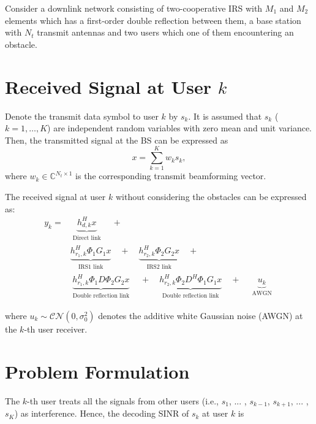 \documentclass[review]{elsarticle}
\begin{document}
		Consider a downlink network consisting of two-cooperative IRS with $M_1$ and $M_2$ elements which has a first-order double reflection between them, a base station with $N_t$ transmit antennas and two users which one of them encountering an obstacle.
		
	\section{Received Signal at User $k$}
		Denote the transmit data symbol to user $k$ by $s_k$. It is assumed that $s_k$ ($k = 1, \ldots, K$) are independent random variables with zero mean and unit variance. Then, the transmitted signal at the BS can be expressed as
		\begin{equation}
			x = \sum_{k=1}^{K} w_k s_k, \label{eq:transmitted_signal}
		\end{equation}
		where $w_k \in \mathbb{C}^{N_t \times 1}$ is the corresponding transmit beamforming vector.
		
		The received signal at user $k$ without considering the obstacles can be expressed as:
		\begin{align*}
			y_k = &\underbrace{h_{d,k}^H x}_
					{\substack{\text{Direct link}}}
				   \quad + \quad \\
    	     	  &\underbrace{h_{r_1,k}^H \Phi_1 G_1 x}_
    	     	  	{\substack{\text{IRS1 link}}}
    	     	   \quad + \quad
   	   			   \underbrace{h_{r_2,k}^H \Phi_2 G_2 x}_
   	   			   	{\substack{\text{IRS2 link}}}
   	   			   \quad + \quad \\ 
    	  		  &\underbrace{h_{r_1,k}^H \Phi_1 D \Phi_2 G_2 x}_
    	  		  	{\substack{\text{Double reflection link}}}
    	  		   \quad + \quad
   	   			   \underbrace{h_{r_2,k}^H \Phi_2 D^H \Phi_1 G_1 x}_
   	   			   	{\substack{\text{Double reflection link}}} \quad + \quad
   	   			   \underbrace{u_k}_
   	   			    {\substack{\text{AWGN}}}
		\end{align*}
	
		where $u_k \sim \mathcal{CN}(0, \sigma_0^2)$ denotes the additive white Gaussian noise (AWGN) at the $k$-th user receiver.
	
	
	\section{Problem Formulation}
		The $k$-th user treats all the signals from other users (i.e.,
		$s_1$, ... , $s_{k-1}$, $s_{k+1}$, ... , $s_K$) as interference. Hence, the decoding SINR of $s_k$ at user $k$ is
		
\end{document}
